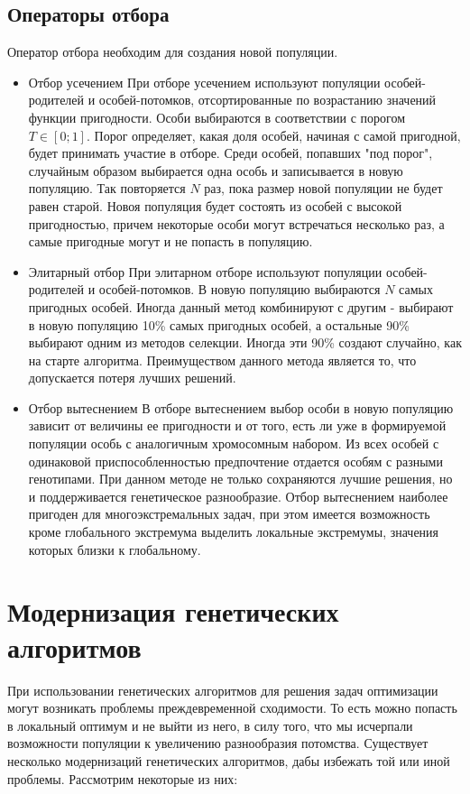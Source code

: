 \begin{itemize}
\section{Операторы отбора}
Оператор отбора необходим для создания новой популяции.
\begin{itemize}[label=$\ast$]
	\item Отбор усечением
При отборе усечением используют популяции особей-родителей и особей-потомков, отсортированные по возрастанию значений функции пригодности. Особи выбираются в соответствии с порогом $T \in [0;1]$. Порог определяет, какая доля особей, начиная с самой пригодной, будет принимать участие в отборе. Среди особей, попавших "под порог", случайным образом выбирается одна особь и записывается в новую популяцию. Так повторяется $N$ раз, пока размер новой популяции не будет равен старой. Новоя популяция будет состоять из особей с высокой пригодностью, причем некоторые особи могут встречаться несколько раз, а самые пригодные могут и не попасть в популяцию.
	\item Элитарный отбор
При элитарном отборе используют популяции особей-родителей и особей-потомков. В новую популяцию выбираются $N$ самых пригодных особей. Иногда данный метод комбинируют с другим - выбирают в новую популяцию 10\% самых пригодных особей, а остальные 90\% выбирают одним из методов селекции. Иногда эти 90\% создают случайно, как на старте алгоритма. Преимуществом данного метода является то, что допускается потеря лучших решений.
	\item Отбор вытеснением
В отборе вытеснением выбор особи в новую популяцию зависит от величины ее пригодности и от того, есть ли уже в формируемой популяции особь с аналогичным хромосомным набором. Из всех особей с одинаковой приспособленностью предпочтение отдается особям с разными генотипами. При данном методе не только сохраняются лучшие решения, но и поддерживается генетическое разнообразие. Отбор вытеснением наиболее пригоден для многоэкстремальных задач, при этом имеется возможность кроме глобального экстремума выделить локальные экстремумы, значения которых близки к глобальному.
\end{itemize}
\chapter{Модернизация генетических алгоритмов}
При использовании генетических алгоритмов для решения задач оптимизации могут возникать проблемы преждевременной сходимости. То есть можно попасть в локальный оптимум и не выйти из него, в силу того, что мы исчерпали возможности популяции к увеличению разнообразия потомства. Существует несколько модернизаций генетических алгоритмов, дабы избежать той или иной проблемы. Рассмотрим некоторые из них:


\end{itemize}
